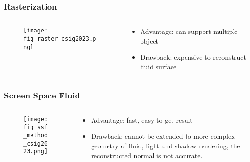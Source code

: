 \begin{frame}
    \frametitle{Rasterization}
    \begin{columns}[c]
        \begin{column}{0.58\textwidth} %
            \begin{figure}[H]
                \centering
                \texttt{[image: fig\_raster\_csig2023.png]}
            \end{figure}
        \end{column}
        \begin{column}{0.4\textwidth} %
            \begin{itemize}
                \item Advantage: can support multiple object
                \item Drawback: expensive to reconstruct fluid surface
            \end{itemize}
        \end{column}
    \end{columns}
\end{frame}

\begin{frame}
    \frametitle{Screen Space Fluid}
    \begin{columns}[c]
        \begin{column}{0.58\textwidth} %
            \begin{figure}[H]
                \centering
                \texttt{[image: fig\_ssf\_method\_csig2023.png]}
            \end{figure}
        \end{column}
        \begin{column}{0.4\textwidth} %
            \begin{itemize}
                \item Advantage: fast, easy to get result
                \item Drawback: cannot be extended to more complex geometry of fluid, light and shadow rendering, the reconstructed normal is not accurate.
            \end{itemize}
        \end{column}
    \end{columns}
\end{frame}

